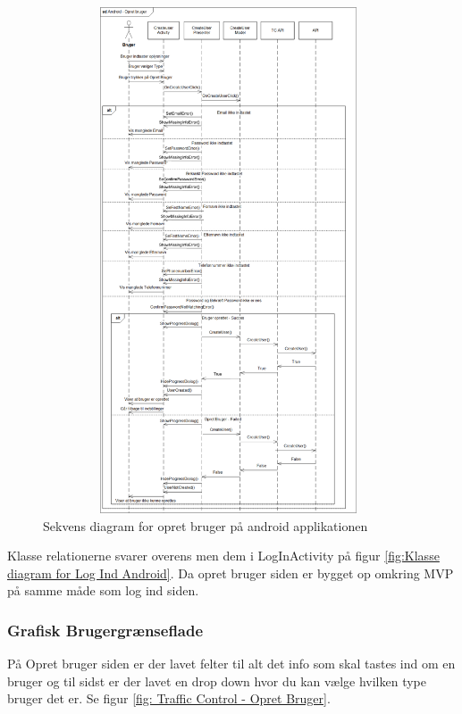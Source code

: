 	\begin{figure} [!ht]
		\begin{center}
			\includegraphics[height=15cm, width=11cm]{Android/Billeder/OpretBrugerSekvens}
		\end{center}
		\caption{Sekvens diagram for opret bruger på android applikationen}
		\label{fig:OpretBrugerSekvens}
	\end{figure}
	Klasse relationerne svarer overens men dem i LogInActivity på figur \ref{fig:Klasse diagram for Log Ind Android}. Da opret bruger siden er bygget op omkring MVP på samme måde som log ind siden.
	
	\clearpage
	
	\subsubsection{Grafisk Brugergrænseflade}
	På Opret bruger siden er der lavet felter til alt det info som skal tastes ind om en bruger og til sidst er der lavet en drop down hvor du kan vælge hvilken type bruger det er.
	Se figur \ref{fig: Traffic Control - Opret Bruger}.
	
